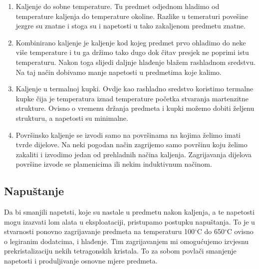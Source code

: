 \documentclass[a4paper,12pt]{article}
\numberwithin{figure}{section}
\begin{document}
\begin{enumerate}
\item Kaljenje do sobne temperature. Tu predmet odjednom hladimo od temperature kaljenja do temperature okoline. Razlike u temeraturi povešine jezgre su znatne i stoga su i napetosti u tako zakaljenom predmetu znatne.
\item Kombinirano kaljenje je kaljenje kod kojeg predmet prvo ohladimo do neke više temperature i tu ga držimo tako dugo dok čitav presjek ne poprimi istu temperaturu. Nakon toga slijedi daljnje hlađenje blažem rashladnom sredstvu. Na taj način dobivamo manje napetosti u predmetima koje kalimo.
\item Kaljenje  u termalnoj kupki. Ovdje kao rashladno sredstvo koristimo termalne kupke čija je temperatura iznad temperature početka stvaranja martenzitne strukture. Ovisno o vremenu držanja predmeta i kupki možemo dobiti željenu strukturu, a napetosti su minimalne.
\item Površinsko kaljenje se izvodi samo na površinama na kojima želimo imati tvrde dijelove. Na neki pogodan način zagrijemo samo površinu koju želimo zakaliti i izvodimo jedan od prehladnih načina kaljenja. Zagrijavanja dijelova površine izvode se plamenicima ili nekim induktivnum načinom.
\end{enumerate}
\subsection{Napuštanje}
Da bi smanjili napetsti, koje su nastale u predmetu nakon kaljenja, a te napetosti mogu izazvati lom alata u eksploataciji, pristupamo postupku napuštanja. To je u stvarnosti ponovno zagrijavanje predmeta na temperaturu 100$^{\circ}$C do 650$^{\circ}$C ovisno o legiranim dodatcima, i hlađenje. Tim zagrijavanjem mi omogućujemo izvjesnu prekristalizaciju nekih tetragonskih kristala. To za sobom povlači smanjenje napetosti i produljivanje osnovne mjere predmeta.
\end{document}
